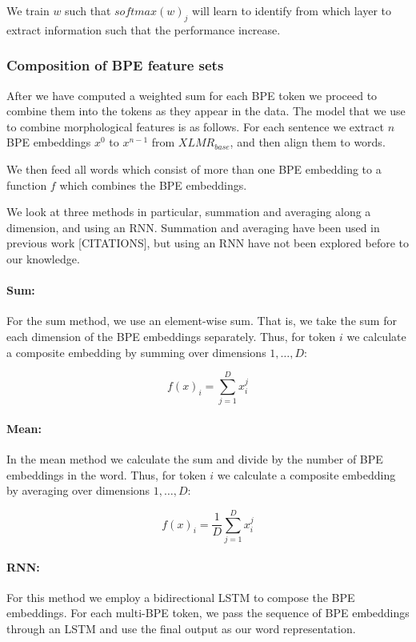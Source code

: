 \documentclass[11pt]{article}
\begin{document}
            We train $w$ such that $softmax(w)_j$ will learn to
     identify from which layer to extract information such that the
     performance increase.

     \subsubsection{Composition of BPE feature sets}
      After we have computed a weighted sum for
     each BPE token we proceed to combine them into the tokens as they
     appear in the data.
	The model that we use to combine morphological features is as
        follows. For each sentence we extract $n$ BPE embeddings $x^0$
        to $x^{n-1}$ from $XLMR_{base}$, and then align them to
        words.

        We then feed all words which consist of more than one
        BPE embedding to a function $f$ which combines the BPE
        embeddings.

        We look at three methods in particular, summation and
        averaging along a dimension, and using an RNN. Summation and
        averaging have been used in previous work [CITATIONS], but
        using an RNN have not been explored before to our knowledge.
    
    	\paragraph{Sum:} For the sum method, we use an element-wise
     sum. That is, we take the sum for each dimension of the BPE
     embeddings separately. Thus, for token $i$ we calculate a
     composite embedding by summing over dimensions $1,\ldots,D$:
	
	\begin{equation}
	f(x)_i = \sum_{j=1}^{D} x_i^j
	\end{equation}
	

    	\paragraph{Mean:} In the mean method we calculate the sum and
     divide by the number of BPE embeddings in the word. Thus, for
     token $i$ we calculate a composite embedding by averaging over
     dimensions $1,\ldots,D$:
	
	\begin{equation}
	f(x)_{i} = \frac{1}{D}\sum_{j=1}^{D} x_i^j
	\end{equation}
	
	
        	\paragraph{RNN:} For this method we employ a bidirectional
     LSTM to compose the BPE embeddings. For each multi-BPE token, we
     pass the sequence of BPE embeddings through an LSTM and use the
     final output as our word representation.
\end{document}
